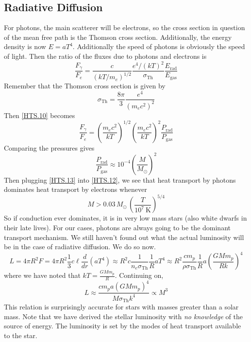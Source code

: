 \documentclass[10pt]{article}
\numberwithin{equation}{section}
\begin{document}
	\subsection{Radiative Diffusion}
	For photons, the main scatterer will be electrons, so the cross section 
in question of the mean free path is the Thomson cross section. 
Additionally, the energy density is now $E=aT^4$. Additionally the speed of 
photons is obviously the speed of light. Then the ratio of the fluxes due 
to photons and electrons is
	\begin{equation}
		\label{HTS.10} \frac{F_{\gamma}}{F_e}=\frac{c}{(kT/m_e)^{1/2}}\frac
{e^4/(kT)^2}{\sigma_{\mathrm{Th}}}\frac{E_{\mathrm{rad}}}{E_{\mathrm{gas}}}
	\end{equation}
	Remember that the Thomson cross section is given by
	\begin{equation}
		\label{HTS.11} \sigma_{\mathrm{Th}}=\frac{8\pi}{3}\frac{e^4}
{(m_ec^2)^2}
	\end{equation}
	Then \eqref{HTS.10} becomes
	\begin{equation}
		\label{HTS.12} \frac{F_\gamma}{F_e}=\left(\frac{m_ec^2}{kT}\right)^
{1/2}\left(\frac{m_ec^2}{kT}\right)^2\frac{P_{\mathrm{rad}}}{P_{\mathrm
{gas}}}
	\end{equation}
	Comparing the pressures gives
	\begin{equation}
		\label{HTS.13} \frac{P_{\mathrm{rad}}}{P_{\mathrm{gas}}}\approx 10^
{-4}\left(\frac{M}{M_\odot}\right)^2
	\end{equation}
	Then plugging \eqref{HTS.13} into \eqref{HTS.12}, we see that heat 
transport by photons dominates heat transport by electrons whenever
	\begin{equation}
		\label{HTS.14} M>0.03\,M_\odot\,\left(\frac{T}{10^7\ \mathrm{K}}
\right)^{5/4}
	\end{equation}
	So if conduction ever dominates, it is in very low mass stars (also 
white dwarfs in their late lives). For our cases, photons are always going 
to be the dominant transport mechanism. We still haven't found out what the 
actual luminosity will be in the case of radiative diffusion. We do so now.
	\begin{equation}
		\label{HTS.15} L=4\pi R^2 F=4\pi R^2\frac{1}{3}c\ell\frac{d}{dr}
\left(aT^4\right)\approx R^2c\frac{1}{n_e\sigma_{\mathrm{Th}}}\frac{1}{R}
aT^4\approx R^2\frac{c m_p}{\rho\sigma_{\mathrm{Th}}}\frac{1}{R}a\left
(\frac{GMm_p}{Rk}\right)^4
	\end{equation}
	where we have noted that $kT=\frac{GMm_p}{R}$. Continuing on,
	\begin{equation}
		\label{HTS.16} L\approx \frac{cm_pa(GMm_p)^4}{M\sigma_{\mathrm{Th}}
k^4}\propto M^3
	\end{equation}
	This relation is surprisingly accurate for stars with masses greater 
than a solar mass. Note that we have derived the stellar luminosity with 
\emph{no knowledge} of the source of energy. The luminosity is set by the 
modes of heat transport available to the star.\\
	
\end{document}
